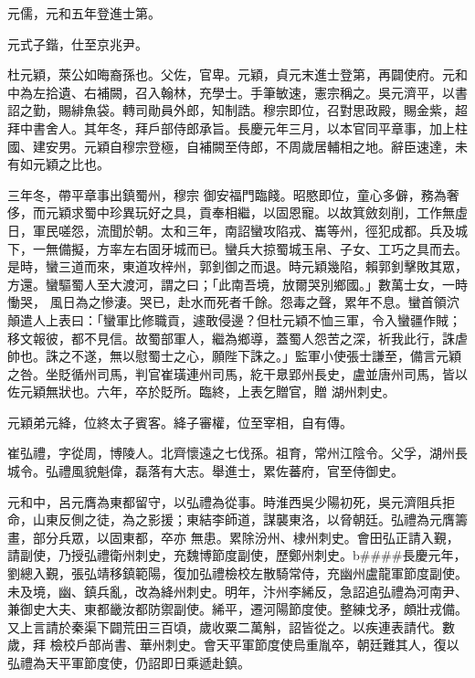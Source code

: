 \begin{pinyinscope}
 元儒，元和五年登進士第。



 元式子鍇，仕至京兆尹。



 杜元穎，萊公如晦裔孫也。父佐，官卑。元穎，貞元末進士登第，再闢使府。元和中為左拾遺、右補闕，召入翰林，充學士。手筆敏速，憲宗稱之。吳元濟平，以書詔之勤，賜緋魚袋。轉司勛員外郎，知制誥。穆宗即位，召對思政殿，賜金紫，超拜中書舍人。其年冬，拜戶部侍郎承旨。長慶元年三月，以本官同平章事，加上柱國、建安男。元穎自穆宗登極，自補闕至侍郎，不周歲居輔相之地。辭臣速達，未有如元穎之比也。



 三年冬，帶平章事出鎮蜀州，穆宗
 御安福門臨餞。昭愍即位，童心多僻，務為奢侈，而元穎求蜀中珍異玩好之具，貢奉相繼，以固恩寵。以故箕斂刻削，工作無虛日，軍民嗟怨，流聞於朝。太和三年，南詔蠻攻陷戎、巂等州，徑犯成都。兵及城下，一無備擬，方率左右固牙城而已。蠻兵大掠蜀城玉帛、子女、工巧之具而去。是時，蠻三道而來，東道攻梓州，郭釗御之而退。時元穎幾陷，賴郭釗擊敗其眾，方還。蠻驅蜀人至大渡河，謂之曰；「此南吾境，放爾哭別鄉國。」數萬士女，一時慟哭，
 風日為之慘淒。哭已，赴水而死者千餘。怨毒之聲，累年不息。蠻首領泬顛遣人上表曰：「蠻軍比修職貢，遽敢侵邊？但杜元穎不恤三軍，令入蠻疆作賊；移文報彼，都不見信。故蜀部軍人，繼為鄉導，蓋蜀人怨苦之深，祈我此行，誅虐帥也。誅之不遂，無以慰蜀士之心，願陛下誅之。」監軍小使張士謙至，備言元穎之咎。坐貶循州司馬，判官崔璜連州司馬，紇干臮郢州長史，盧並唐州司馬，皆以佐元穎無狀也。六年，卒於貶所。臨終，上表乞贈官，贈
 湖州刺史。



 元穎弟元絳，位終太子賓客。絳子審權，位至宰相，自有傳。



 崔弘禮，字從周，博陵人。北齊懷遠之七伐孫。祖育，常州江陰令。父孚，湖州長城令。弘禮風貌魁偉，磊落有大志。舉進士，累佐蕃府，官至侍御史。



 元和中，呂元膺為東都留守，以弘禮為從事。時淮西吳少陽初死，吳元濟阻兵拒命，山東反側之徒，為之影援；東結李師道，謀襲東洛，以脅朝廷。弘禮為元膺籌畫，部分兵眾，以固東都，卒亦
 無患。累除汾州、棣州刺史。會田弘正請入覲，請副使，乃授弘禮衛州刺史，充魏博節度副使，歷鄭州刺史。b####長慶元年，劉總入覲，張弘靖移鎮範陽，復加弘禮檢校左散騎常侍，充幽州盧龍軍節度副使。未及境，幽、鎮兵亂，改為絳州刺史。明年，汴州李絺反，急詔追弘禮為河南尹、兼御史大夫、東都畿汝都防禦副使。絺平，遷河陽節度使。整練戈矛，頗壯戎備。又上言請於秦渠下闢荒田三百頃，歲收粟二萬斛，詔皆從之。以疾連表請代。數歲，拜
 檢校戶部尚書、華州刺史。會天平軍節度使烏重胤卒，朝廷難其人，復以弘禮為天平軍節度使，仍詔即日乘遞赴鎮。




\end{pinyinscope}
